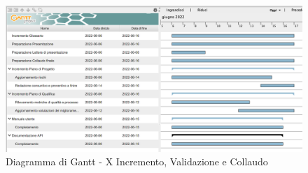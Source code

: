 \begin{figure}[H]
	\centering
	\includegraphics[scale=0.40]{Sezioni/gantt/X_incremento.png}
	\caption{Diagramma di Gantt - X Incremento, Validazione e Collaudo}
\end{figure}









